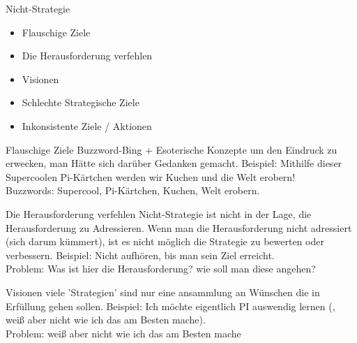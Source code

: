 \begin{frame}[c]{Nicht-Strategie}
    \large
    \begin{itemize}
        \item Flauschige Ziele \pause
        \item Die Herausforderung verfehlen \pause
        \item Visionen \pause
        \item Schlechte Strategische Ziele \pause
        \item Inkonsistente Ziele / Aktionen \pause
    \end{itemize}
\end{frame}


\ifonline
\begin{frame}[c]{Flauschige Ziele}
    Buzzword-Bing + Esoterische Konzepte um den Eindruck zu erwecken,
    man Hätte sich darüber Gedanken gemacht.
    \newline
    \newline
    \pause
    Beispiel: Mithilfe dieser Supercoolen Pi-Kärtchen werden wir Kuchen und die Welt erobern! \pause \\
    Buzzwords: Supercool, Pi-Kärtchen, Kuchen, Welt erobern.
\end{frame}


\begin{frame}[c]{Die Herausforderung verfehlen}
    Nicht-Strategie ist nicht in der Lage, die Herausforderung zu Adressieren.
    Wenn man die Herausforderung nicht adressiert (sich darum kümmert), ist es
    nicht möglich die Strategie zu bewerten oder verbessern.
    \newline
    \newline
    \pause
    Beispiel: Nicht aufhören, bis man sein Ziel erreicht. \\ \pause
    Problem: Was ist hier die Herausforderung? wie soll man diese angehen?
\end{frame}


\begin{frame}[c]{Visionen}
    viele 'Strategien' sind nur eine ansammlung an Wünschen die in Erfüllung gehen sollen.
    \newline
    \newline
    \pause
    Beispiel: Ich möchte eigentlich PI auswendig lernen (, weiß aber nicht wie ich das am Besten mache). \\ \pause
    Problem: weiß aber nicht wie ich das am Besten mache
\end{frame}


